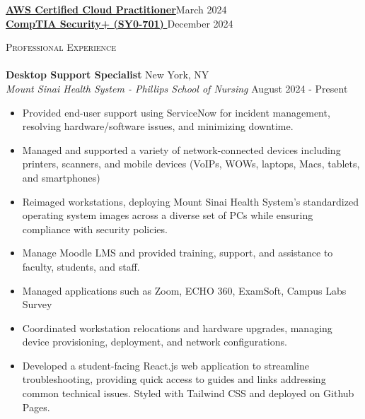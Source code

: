 \documentclass[a4paper]{article}
\newcommand{\lineunder} {
    \vspace*{-8pt} \\
    \hspace*{-18pt} \hrulefill \\
}
\newcommand{\header} [1] {
    {\hspace*{-18pt}\vspace*{5.5pt} \textsc{#1}}
    \vspace*{-6pt} \lineunder
}
\begin{document}
\href{https://www.credly.com/badges/b2b0c37e-8bad-4c8c-aabf-d58ddf403292}{\textbf{AWS Certified Cloud Practitioner}}\hfill March 2024\\
\vspace{0mm}
\href{https://www.credly.com/badges/2817621d-e0e1-4dd2-b066-66265586aaf2}{\textbf{CompTIA Security+ (SY0-701) }}\hfill December 2024\\

\vspace{0mm}

\header{Professional Experience}
\vspace{-0.5mm}
\textbf{Desktop Support Specialist} \hfill New York, NY\\
\textit{Mount Sinai Health System - Phillips School of Nursing} \hfill August 2024 - Present\\
\vspace{-2.5mm}
\begin{itemize}[leftmargin=0.5cm]
\setlength\itemsep{-1mm}
    \item Provided end-user support using ServiceNow for incident management, resolving hardware/software issues, and minimizing downtime.

    \item Managed and supported a variety of network-connected devices including printers, scanners, and mobile devices (VoIPs, WOWs, laptops, Macs, tablets, and smartphones)
    
    \item Reimaged workstations, deploying Mount Sinai Health System's standardized operating system images across a diverse set of PCs while ensuring compliance with security policies.
    \item Manage Moodle LMS and provided training, support, and assistance to faculty, students, and staff. 
    \item Managed applications such as Zoom, ECHO 360, ExamSoft, Campus Labs Survey 
    \item Coordinated workstation relocations and hardware upgrades, managing device provisioning, deployment, and network configurations.

    \item Developed a student-facing React.js web application to streamline troubleshooting, providing quick access to guides and links addressing common technical issues. Styled with Tailwind CSS and deployed on Github Pages.
\end{itemize}
\vspace*{0mm}
\end{document}
